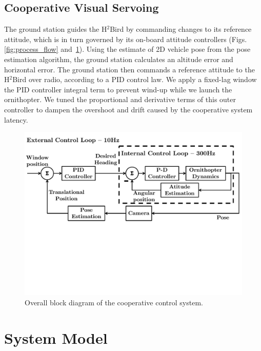 \documentclass{aamas2013}
\begin{document}
\subsection{Cooperative Visual Servoing}
\label{sec:visual_servoing_concept}
The ground station guides the H$^2$Bird by commanding changes to its 
reference attitude, which is in turn governed by its on-board attitude 
controllers (Figs.\ref{fig:process_flow} and~\ref{fig:block_diagram}). Using 
the estimate of 2D vehicle pose from the pose estimation algorithm, the 
ground station calculates an altitude error and horizontal error. The ground 
station then commands a reference attitude to the H$^2$Bird over radio, 
according to a PID control law. We apply a fixed-lag window the PID 
controller integral term to prevent wind-up while we launch the ornithopter. 
We tuned the proportional and derivative terms of this outer controller to 
dampen the overshoot and drift caused by the cooperative system latency.
\begin{figure}[tb]
\centering
\includegraphics[width=\linewidth]{figures/block_diagrams.pdf}
\caption{Overall block diagram of the cooperative control system.}
\label{fig:block_diagram}
\end{figure}

\section{System Model}
\label{sec:system_model}

\end{document}
